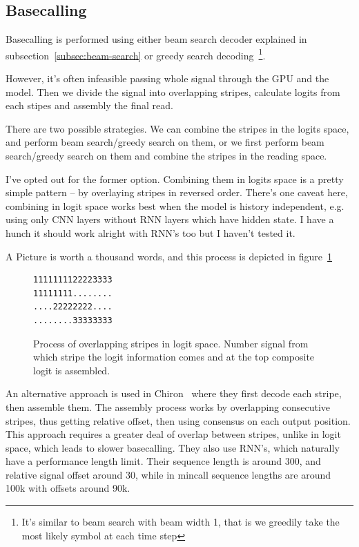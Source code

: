 \documentclass[times, utf8, diplomski, english]{fer}
\begin{document}
\subsection{Basecalling}
\label{subsec:basecalling}

Basecalling is performed using either beam search decoder explained in subsection~\ref{subsec:beam-search} or greedy search 
decoding~\footnote{It's similar to beam search with beam width 1, that is we greedily take the most likely symbol at each time step}.

However, it's often infeasible passing whole signal through the GPU and the model. 
Then we divide the signal into overlapping stripes, calculate logits from each stipes and assembly the final read. 

There are two possible strategies. We can combine the stripes in the logits space, and perform beam search/greedy search on them, 
or we first perform beam search/greedy search on them and combine the stripes in the reading space. 

I've opted out for the former option. 
Combining them in logits space is a pretty simple pattern -- by overlaying stripes in reversed order.
There's one caveat here, combining in logit space works best when the model is history independent, e.g.
using only CNN layers without RNN layers which have hidden state. I have a hunch it should work alright with RNN's too but I haven't tested it.

A Picture is worth a thousand words, and this process is depicted in figure~\ref{fg:logit_comp}

\begin{figure}
\label{fg:logit_comp}
\begin{center}
\begin{verbatim}
1111111122223333
11111111........
....22222222....
........33333333
\end{verbatim}
\caption{Process of overlapping stripes in logit space. Number signal from which stripe the logit information comes and at the top composite logit is assembled.}
\end{center}
\end{figure}

An alternative approach is used in Chiron~\citep{chiron_teng} where they first decode each stripe, then assemble them. 
The assembly process works by overlapping consecutive stripes, thus getting relative offset, then using consensus on each output position.
This approach requires a greater deal of overlap between stripes, unlike in logit space, which leads to slower basecalling.
They also use RNN's, which naturally have a performance length limit. 
Their sequence length is around 300, and relative signal offset around 30, 
while in mincall sequence lengths are around 100k with offsets around 90k.
\end{document}
